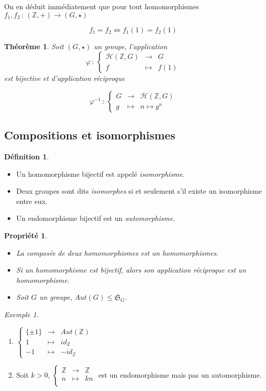 \documentclass[]{article}
\newtheorem{mythm}{Théorème}
\newtheorem{myproperty}{Propriété}
\theoremstyle{remark}
\newtheorem{myexmpl}{Exemple}
\theoremstyle{definition}
\newtheorem{mydef}{Définition}
\newcommand{\func}[5]{
#1 \, : \, \left\{ \begin{array}{lcl}
	#2 & \longrightarrow & #3 \\
	#4 & \longmapsto & #5
\end{array}
\right.
}
\newcommand{\funcshort}[3]{
#1 \, : \, #2 \longrightarrow #3
}
\begin{document}
On en déduit immédiatement que pour tout homomorphismes $\funcshort{f_1, f_2}{(\mathbb{Z}, +)}{(G, \star)}$

$$f_1=f_2 \Longleftrightarrow f_1(1)=f_2(1)$$

\begin{mythm}
	Soit $(G, \star)$ un groupe, l'application
	$$
	\func{\varphi}{\mathcal{H}(\mathbb{Z}, G)}{G}{f}{f(1)}
	$$
	est bijective et d'application réciproque
	
	$$
	\func{\varphi^{-1}}{G}{\mathcal{H}(\mathbb{Z}, G)}{g}{n \longmapsto g^n}
	$$
\end{mythm}

\subsection{Compositions et isomorphismes}

\begin{mydef}
	\leavevmode
	\begin{itemize}
		\item Un homomorphisme bijectif est appelé \textit{isomorphisme}.
		\item Deux groupes sont dits \textit{isomorphes} si et seulement s'il existe un isomorphisme entre eux.
		\item Un endomorphisme bijectif est un \textit{automorphisme}.
	\end{itemize}
\end{mydef}

\begin{myproperty}
	\leavevmode
	\begin{itemize}
		\item La composée de deux homomorphismes est un homomorphismes.
		\item Si un homomorphisme est bijectif, alors son application réciproque est un homomorphisme.
		\item Soit $G$ un groupe, $Aut(G) \leqslant \mathfrak{S}_G$.
	\end{itemize}
\end{myproperty}

\begin{myexmpl}
	\leavevmode
	\begin{enumerate}
		\item
		$\left\{\begin{array}{rcl}
			\{\pm 1\} & \longrightarrow & Aut(\mathbb{Z}) \\
			1 & \longmapsto & id_{\mathbb{Z}} \\
			-1 & \longmapsto & -id_{\mathbb{Z}}
		\end{array}\right.$
	
	\item Soit $k > 0$, 
		$\left\{\begin{array}{rcl}
			\mathbb{Z} & \longrightarrow & \mathbb{Z} \\
			n & \longmapsto & kn \\
		\end{array}\right.$ est un endomorphisme mais pas un automorphisme.
	\end{enumerate}
\end{myexmpl}
\end{document}
